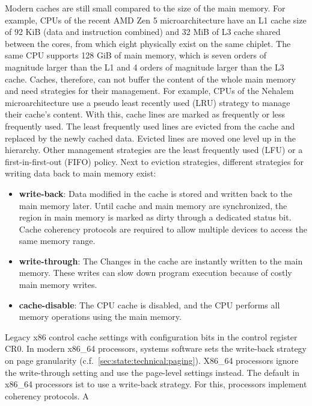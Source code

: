 Modern caches are still small compared to the size of the main memory. For
example, CPUs of the recent AMD Zen 5 microarchitecture have an L1
cache size of 92 KiB (data and instruction combined) and 32 MiB of L3 cache
shared between the cores, from which eight physically exist on the same chiplet.
The same CPU supports 128 GiB of main memory, which is seven orders of magnitude
larger than the L1 and 4 orders of magnitude larger than the L3 cache.
Caches, therefore, can not buffer the content of the whole main memory and need
strategies for their management. For example, CPUs of the Nehalem
microarchitecture use a pseudo least recently used (LRU) strategy to manage
their cache's content.\cite{hennessy2011computer} With this, cache lines are
marked as frequently or less frequently used. The least frequently used lines
are evicted from the cache and replaced by the newly cached data. Evicted
lines are moved one level up in the hierarchy. Other management strategies are
the least frequently used (LFU) or a first-in-first-out (FIFO) policy. Next to
eviction strategies, different strategies for writing data back to main memory
exist:
\begin{itemize}
    \item \textbf{write-back}: Data modified in the cache is stored and
          written back to the main memory later. Until cache and main memory are
          synchronized, the region in main memory is marked as dirty through a
          dedicated status bit. Cache coherency protocols are required to
          allow multiple devices to access the same memory range.
    \item \textbf{write-through}: The Changes in the cache are instantly written
          to the main memory. These writes can slow down program execution
          because of costly main memory writes.
    \item \textbf{cache-disable}: The CPU cache is disabled, and the CPU
          performs all memory operations using the main memory.
\end{itemize}
Legacy x86 control cache settings with configuration bits in the control
register CR0. In modern x86\_64 processors, systems software sets the write-back
strategy on page granularity (c.f.~\ref{sec:state:technical:paging}). X86\_64
processors ignore the write-through setting and use the page-level settings
instead. \cite{amd_manual} The default in x86\_64 processors ist to use a
write-back strategy. For this, processors implement coherency protocols. A
